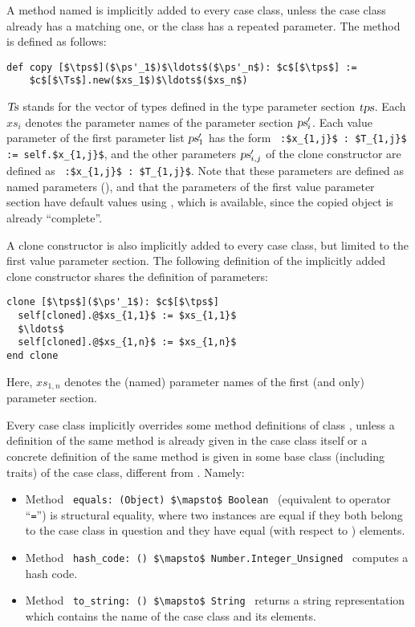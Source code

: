 A method named  is implicitly added to every case class, unless the case class already has a matching one, or the class has a repeated parameter. The method is defined as follows:
\begin{lstlisting}
def copy [$\tps$]($\ps'_1$)$\ldots$($\ps'_n$): $c$[$\tps$] :=
    $c$[$\Ts$].new($xs_1$)$\ldots$($xs_n$)
\end{lstlisting}
$\mbox{\sl Ts}$ stands for the vector of types defined in the type parameter section $\mbox{\sl tps}$. Each $xs_i$ denotes the parameter names of the parameter section $\mbox{\sl ps}'_i$.  Each value parameter of the first parameter list $\mbox{\sl ps}'_1$ has the form ~\lstinline!:$x_{1,j}$ : $T_{1,j}$ := self.$x_{1,j}$!, and the other parameters $\mbox{\sl ps}'_{i,j}$ of the clone constructor are defined as ~\lstinline!:$x_{1,j}$ : $T_{1,j}$!. Note that these parameters are defined as named parameters (), and that the parameters of the first value parameter section have default values using , which is available, since the copied object is already ``complete''. 

A clone constructor is also implicitly added to every case class, but limited to the first value parameter section. The following definition of the implicitly added clone constructor shares the definition of parameters: 
\begin{lstlisting}
clone [$\tps$]($\ps'_1$): $c$[$\tps$]
  self[cloned].@$xs_{1,1}$ := $xs_{1,1}$
  $\ldots$
  self[cloned].@$xs_{1,n}$ := $xs_{1,n}$
end clone
\end{lstlisting}
Here, $xs_{1,n}$ denotes the (named) parameter names of the first (and only) parameter section. 

Every case class implicitly overrides some method definitions of class , unless a definition of the same method is already given in the case class itself or a concrete definition of the same method is given in some base class (including traits) of the case class, different from . Namely: 
\begin{itemize}
\item[]
Method ~\lstinline!equals: (Object) $\mapsto$ Boolean!~ (equivalent to operator ``\lstinline!=!'') is structural equality, where two instances are equal if they both belong to the case class in question and they have equal (with respect to ) elements. 

\item[]
Method ~\lstinline!hash_code: () $\mapsto$ Number.Integer_Unsigned!~ computes a hash code. 

\item[]
Method ~\lstinline!to_string: () $\mapsto$ String!~ returns a string representation which contains the name of the case class and its elements. 
\end{itemize}






